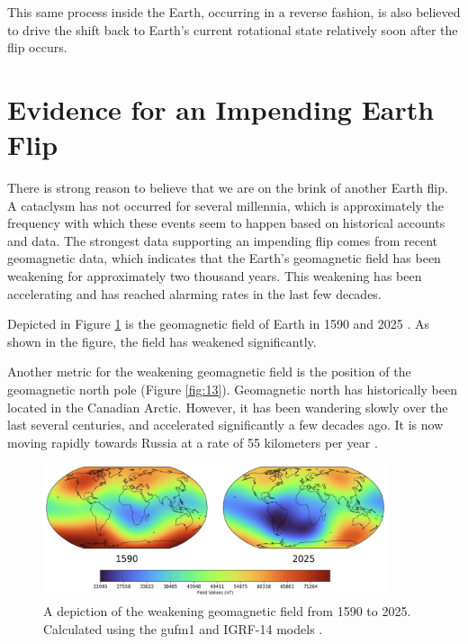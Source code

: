 \documentclass[10pt,twocolumn,letterpaper]{article}
\begin{document}
This same process inside the Earth, occurring in a reverse fashion, is also believed to drive the shift back to Earth's current rotational state relatively soon after the flip occurs.

\section{Evidence for an Impending Earth Flip}

There is strong reason to believe that we are on the brink of another Earth flip. A cataclysm has not occurred for several millennia, which is approximately the frequency with which these events seem to happen based on historical accounts and data. The strongest data supporting an impending flip comes from recent geomagnetic data, which indicates that the Earth's geomagnetic field has been weakening for approximately two thousand years. This weakening has been accelerating and has reached alarming rates in the last few decades.

Depicted in Figure \ref{fig:14} is the geomagnetic field of Earth in 1590 and 2025 \cite{125,126}. As shown in the figure, the field has weakened significantly.

Another metric for the weakening geomagnetic field is the position of the geomagnetic north pole (Figure \ref{fig:13}). Geomagnetic north has historically been located in the Canadian Arctic. However, it has been wandering slowly over the last several centuries, and accelerated significantly a few decades ago. It is now moving rapidly towards Russia at a rate of 55 kilometers per year \cite{124}.

\begin{figure}[t]
\begin{center}
\includegraphics[width=0.9\textwidth]{saa.jpg}
\end{center}
   \caption{A depiction of the weakening geomagnetic field from 1590 to 2025. Calculated using the gufm1 and IGRF-14 models \cite{125,126}.}
\label{fig:14}
\end{figure}
\end{document}
